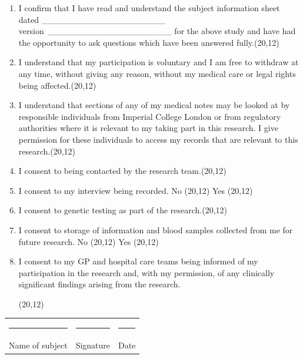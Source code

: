 \documentclass[a4paper,10pt]{article}
\begin{document}
 \begin{enumerate}
  \item I confirm that I have read and understand the subject information sheet dated
	\_\_\_\_\_\_\_\_\_\_\_\_\_\_\_\_\_\_\_\_ version \_\_\_\_\_\_\_\_\_\_\_\_\_\_\_\_\_\_\_\_ for the  above study and have had the opportunity to ask questions which have been answered fully.\hfill \framebox(20,12){}
  \item I understand that my participation is voluntary and I am free to withdraw at any time,	
	without giving any reason, without my medical care or legal rights being affected.\hfill \framebox(20,12){}
  \item I understand that sections of any of my medical notes may be looked at by responsible
	individuals from Imperial College London or from regulatory authorities where 
	it is relevant to my taking part in this research. I give permission for these individuals to 
	access my records that are relevant to this research.\hfill \framebox(20,12){}
  \item I consent to being contacted by the research team.\hfill \framebox(20,12){}
  \item I consent to my interview being recorded.  
      \hfill No \framebox(20,12){} Yes \framebox(20,12){}
  \item I consent to genetic testing as part of the research.\hfill \framebox(20,12){}
  \item I consent to storage of information and blood samples collected from me for future research.
      \hfill No \framebox(20,12){} Yes \framebox(20,12){}
  \item I consent to my GP and hospital care teams being informed of my participation in the research and, with my permission, of any clinically significant findings arising from the research.
      \begin{flushright} \framebox(20,12){} \end{flushright}
	
 \end{enumerate}

\vspace{0.6cm}

 \begin{tabular}{p{4cm}p{4cm}p{4cm}}
    \rule{10em}{.3pt} & \rule{10em}{.3pt} & \rule{10em}{.3pt} \\
     Name of subject  & Signature  & Date \\
 \end{tabular}
\end{document}
